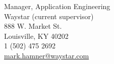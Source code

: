   {Manager, Application Engineering 
  \\ Waystar (current supervisor)
  \\ 888 W. Market St.
  \\ Louisville, KY 40202
  \\ 1 (502) 475 2692 
  \\ \href{mailto:mark.hamner@waystar.com}{mark.hamner@waystar.com}
}
